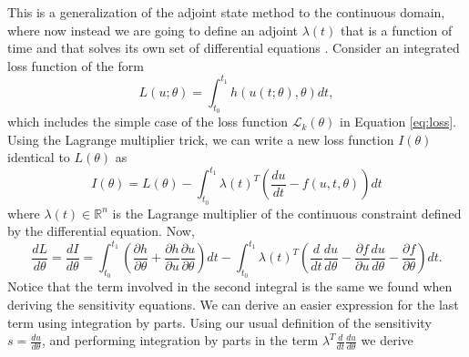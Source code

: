 

This is a generalization of the adjoint state method to the continuous domain, where now instead we are going to define an adjoint $\lambda(t)$ that is a function of time and that solves its own set of differential equations \cite{ma_comparison_2021}. %
Consider an integrated loss function of the form 
\begin{equation}
    L(u; \theta) = \int_{t_0}^{t_1} h(u(t;\theta), \theta) dt,
\end{equation}
which includes the simple case of the loss function $\mathcal L_k(\theta)$ in Equation \eqref{eq:loss}. 
Using the Lagrange multiplier trick, we can write a new loss function $I(\theta)$ identical to $L(\theta)$ as 
\begin{equation}
    I(\theta) = L(\theta) - \int_{t_0}^{t_1} \lambda(t)^T \left( \frac{du}{dt} - f(u, t, \theta) \right) dt
\end{equation}
where $\lambda(t) \in \mathbb R^n$ is the Lagrange multiplier of the continuous constraint defined by the differential equation. Now, 
\begin{equation}
    \frac{dL}{d\theta} = \frac{dI}{d\theta} = 
    \int_{t_0}^{t_1} \left( \frac{\partial h}{\partial \theta} + \frac{\partial h}{\partial u} \frac{\partial u}{\partial \theta} \right) dt
    - 
    \int_{t_0}^{t_1} \lambda(t)^T \left( \frac{d}{dt} \frac{du}{d\theta} - \frac{\partial f}{\partial u} \frac{du}{d\theta} - \frac{\partial f}{\partial \theta} \right) dt.
\end{equation}
Notice that the term involved in the second integral is the same we found when deriving the sensitivity equations. 
We can derive an easier expression for the last term using integration by parts. 
Using our usual definition of the sensitivity $s = \frac{du}{d\theta}$, and performing integration by parts in the term $\lambda^T \frac{d}{dt} \frac{du}{d\theta}$ we derive 
